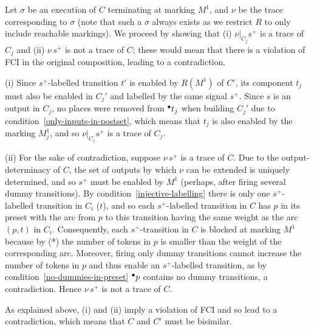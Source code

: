 Let $\sigma$ be an execution of $C$ terminating at marking $M^1$,
and $\nu$ be the trace corresponding to $\sigma$ (note that
such a $\sigma$ always exists as we restrict $R$ to only include reachable markings).
We proceed by showing that (i)
$\nu|_{C_j}s^+$ is a trace of $C_j$ and (ii) $\nu\, s^+$ is not
a trace of $C$; these would mean that there is a violation of
FCI in the original composition, leading to a contradiction.

(i) Since $s^+$-labelled transition $t'$ is enabled by $R(M^1)$ of $C'$, 
its component $t_j$ must also be enabled in $C_j'$ and labelled by the same signal $s^+$.
Since $s$ is an output in $C_j$, no places were removed from ${}^\bullet {t_j}$ when building
$C_j'$ due to condition~\ref{only-inputs-in-postset}, which
means that $t_j$ is also enabled by the marking $M^1_j$, and so $\nu|_{C_j}s^+$
is a trace of $C_j$.

(ii) For the sake of contradiction, suppose $\nu\,s^+$ is a
trace of $C$. Due to the output-determinacy of $C$, the set of
outputs by which $\nu$ can be extended is uniquely determined,
and so $s^+$ must be enabled by $M^1$ (perhaps, after firing
several dummy transitions). By
condition~\ref{injective-labelling} there is only one
$s^+$-labelled transition in $C_i$ (\viz $t$), and so each
$s^+$-labelled transition in $C$ has $p$ in its preset with the
arc from $p$ to this transition having the same weight as the
arc $(p,t)$ in $C_i$. Consequently, each $s^+$-transition in
$C$ is blocked at marking $M^1$ because by (*) the number of tokens
in $p$ is smaller than the weight of the corresponding arc.
Moreover, firing only dummy transitions cannot increase the
number of tokens in $p$ and thus enable an $s^+$-labelled
transition, as by condition~\ref{no-dummies-in-preset}
${}^\bullet {p}$ contains no dummy transitions, a contradiction. Hence
$\nu\,s^+$ is not a trace of $C$.

As explained above, (i) and (ii) imply a violation of FCI and
so lead to a contradiction, which means that $C$ and
$C'$ must be bisimilar.
